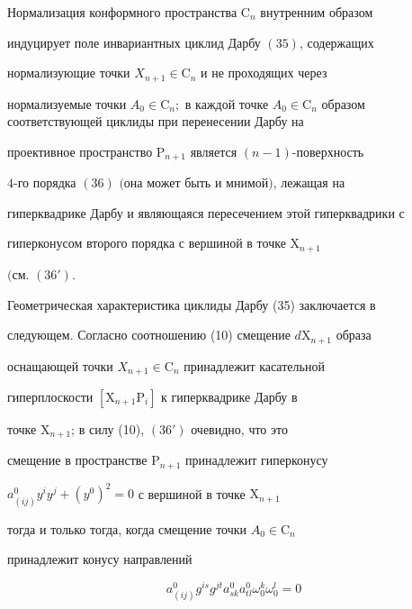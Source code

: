  


\begin{thm} 


Нормализация конформного пространства $\mathrm C_n$ внутренним образом 


индуцирует поле инвариантных циклид Дарбу $(35)$, содержащих 


нормализующие точки $X_{n+1}\in\mathrm C_n$ и не проходящих через 


нормализуемые точки $A_0\in\mathrm C_n;$ в каждой точке $A_0\in\mathrm 


C_n$ образом соответствующей циклиды при перенесении Дарбу на 


проективное пространство $\mathrm P_{n+1}$ является $(n-1)$-поверхность 


$4$-го порядка $(36)$ $($она может быть и мнимой$)$, лежащая на 


гиперквадрике Дарбу и являющаяся пересечением этой гиперквадрики с 


гиперконусом второго порядка с вершиной в точке $\mathrm X_{n+1}$ 


$($см. $(36')$. 


\end{thm} 


 


Геометрическая характеристика циклиды Дарбу (35) заключается в 


следующем. Согласно соотношению (10) смещение $d\mathrm X_{n+1}$ образа 


оснащающей точки $X_{n+1}\in\mathrm C_n$ принадлежит касательной 


гиперплоскости $[\mathrm X_{n+1}\mathrm P_i]$ к гиперквадрике Дарбу в 


точке $\mathrm X_{n+1}$; в силу (10), $(36')$ очевидно, что это 


смещение в пространстве $\mathrm P_{n+1}$ принадлежит гиперконусу 


$a^0_{(i j)}y^i y^j+(y^0)^2=0$ с вершиной в точке $\mathrm X_{n+1}$ 


тогда и только тогда, когда смещение точки $A_0\in\mathrm C_n$ 


принадлежит конусу направлений 


\begin{equation} 


a^0_{(i j)}g^{is}g^{j t}a^0_{s k}a^0_{t l} 


\omega^k_0\omega^l_0=0 


\end{equation} 


